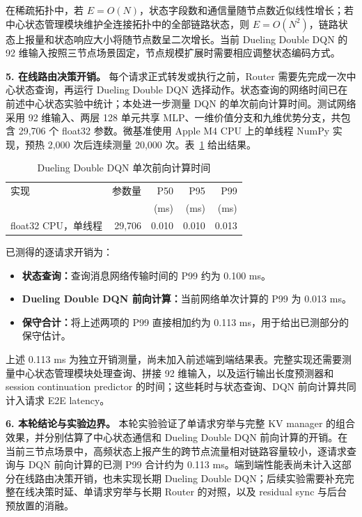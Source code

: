 在稀疏拓扑中，若 \(E=O(N)\)，状态字段数和通信量随节点数近似线性增长；若中心状态管理模块维护全连接拓扑中的全部链路状态，则 \(E=O(N^2)\)，链路状态上报量和状态响应大小将随节点数呈二次增长。当前 Dueling Double DQN 的 92 维输入按照三节点场景固定，节点规模扩展时需要相应调整状态编码方式。

\medskip
\noindent\textbf{5. 在线路由决策开销。}
每个请求正式转发或执行之前，Router 需要先完成一次中心状态查询，再运行 Dueling Double DQN 选择动作。状态查询的网络时间已在前述中心状态实验中统计；本处进一步测量 DQN 的单次前向计算时间。测试网络采用 92 维输入、两层 128 单元共享 MLP、一维价值分支和九维优势分支，共包含 29,706 个 float32 参数。微基准使用 Apple M4 CPU 上的单线程 NumPy 实现，预热 2,000 次后连续测量 20,000 次。表~\ref{tab:dqn-forward-overhead} 给出结果。

\begin{table}[H]
\centering
\small
\caption{Dueling Double DQN 单次前向计算时间}
\label{tab:dqn-forward-overhead}
\begin{tabular}{@{}lrrrr@{}}
\toprule
实现 & 参数量 & P50 & P95 & P99 \\
 & & (ms) & (ms) & (ms) \\
\midrule
float32 CPU，单线程
& 29,706 & 0.010 & 0.010 & 0.013 \\
\bottomrule
\end{tabular}
\end{table}

已测得的逐请求开销为：
\begin{itemize}
    \item \textbf{状态查询：}查询消息网络传输时间的 P99 约为 0.100 ms。
    \item \textbf{Dueling Double DQN 前向计算：}当前网络单次计算的 P99 为 0.013 ms。
    \item \textbf{保守合计：}将上述两项的 P99 直接相加约为 0.113 ms，用于给出已测部分的保守估计。
\end{itemize}
上述 0.113 ms 为独立开销测量，尚未加入前述端到端结果表。完整实现还需要测量中心状态管理模块处理查询、拼接 92 维输入，以及运行输出长度预测器和 session continuation predictor 的时间；这些耗时与状态查询、DQN 前向计算共同计入请求 E2E latency。

\medskip
\noindent\textbf{6. 本轮结论与实验边界。}
本轮实验验证了单请求穷举与完整 KV manager 的组合效果，并分别估算了中心状态通信和 Dueling Double DQN 前向计算的开销。在当前三节点场景中，高频状态上报产生的跨节点流量相对链路容量较小，逐请求查询与 DQN 前向计算的已测 P99 合计约为 0.113 ms。端到端性能表尚未计入这部分在线路由决策开销，也未实现长期 Dueling Double DQN；后续实验需要补充完整在线决策时延、单请求穷举与长期 Router 的对照，以及 residual sync 与后台预放置的消融。

